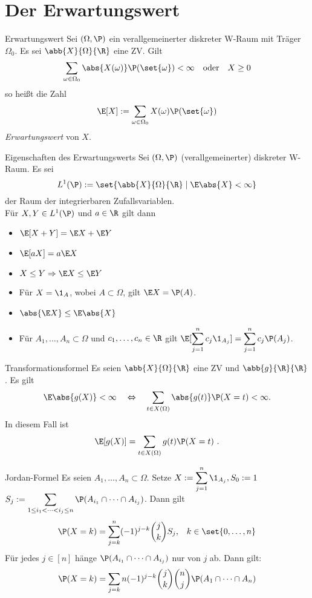 \section*{Der Erwartungswert}

\begin{karte}{Erwartungswert}
	Sei $(\Omega,\P)$ ein verallgemeinerter diskreter W-Raum mit Träger $\Omega_0$. Es sei $\abb{X}{\Omega}{\R}$ eine ZV. Gilt
	$$ \sum_{\omega \in \Omega_0} \abs{X(\omega)}\P(\set{\omega}) < \infty \quad \text{oder} \quad X \geq 0$$
	so heißt die Zahl
	$$ \E[X] := \sum_{\omega \in \Omega_0} X(\omega)\P(\set{\omega})$$
	\textit{Erwartungswert} von $X$.
\end{karte}

\begin{karte}{Eigenschaften des Erwartungswerts}
	Sei $(\Omega,\P)$ (verallgemeinerter) diskreter W-Raum. Es sei 
	$$ L^1(\P) := \set{\abb{X}{\Omega}{\R} \;|\; \E\abs{X} < \infty}$$ der Raum der integrierbaren Zufallsvariablen. \\
	Für $X,Y \in L^1(\P)$ und $a \in \R$ gilt dann
	\begin{itemize}
		\item $\E[X+Y] = \E X+\E Y$
		\item $\E[aX] = a\E X$
		\item $ X \leq Y \Rightarrow \E X \leq  \E Y$
		\item Für $X = \1_{A}$, wobei $A\subset \Omega$, gilt $\E X = \P(A)$.
		\item $\abs{\E X} \leq \E\abs{X}$
		\item Für $A_1,\dotsc,A_n \subset \Omega$ und $c_1,\dotsc,c_n \in \R$ gilt $\displaystyle \E[\sum_{j=1}^{n} c_j\1_{A_j}] = \sum_{j=1}^{n} c_j\P(A_j)$.
	\end{itemize}
\end{karte}

\begin{karte}{Transformationsformel}
	Es seien $\abb{X}{\Omega}{\R}$ eine ZV und $\abb{g}{\R}{\R}$. Es gilt 
	$$ \E\abs{g(X)} < \infty \quad \Leftrightarrow \quad \sum_{t \in X(\Omega)} \abs{g(t)}\P(X=t) < \infty \text{.}$$
	In diesem Fall ist
	$$ \E[g(X)] = \sum_{t \in X(\Omega)} g(t)\P(X=t) \text{ .}$$
\end{karte}

\begin{karte}{Jordan-Formel}
	Es seien $A_1,\dotsc,A_n \subset \Omega$. Setze $\displaystyle X := \sum_{j=1}^{n} \1_{A_j}, S_0:= 1$ \\
	$\displaystyle S_j := \sum_{1 \leq i_1 <\dots < i_j \leq n} \P(A_{i_1} \cap \dots \cap A_{i_j})$. Dann gilt
	$$\P(X=k)=\sum_{j=k}^{n} (-1)^{j-k} \binom{j}{k} S_j \text{,} \quad k \in \set{0,\dotsc,n}$$
	Für jedes $j \in [n]$ hänge $\P(A_{i_1} \cap \dots \cap A_{i_j})$ nur von $j$ ab. Dann gilt:
	$$\P(X=k)=\sum_{j=k}{n} (-1)^{j-k} \binom{j}{k} \binom{n}{j} \P(A_1 \cap \dots \cap A_n)$$
\end{karte}